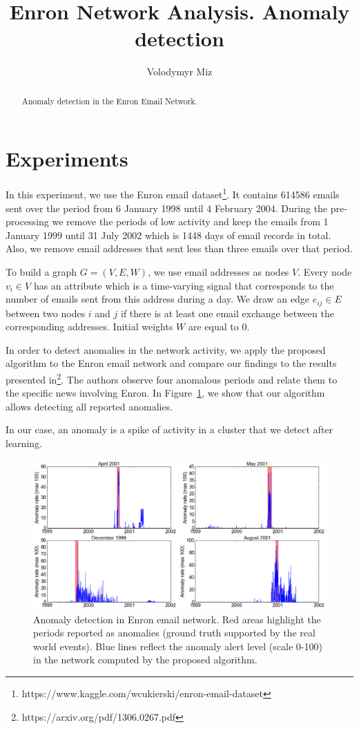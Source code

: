 \documentclass[]{article}
\title{Enron Network Analysis. Anomaly detection}
\author{Volodymyr Miz}
\begin{document}
\maketitle

\begin{abstract}
Anomaly detection in the Enron Email Network.
\end{abstract}

\section{Experiments}
In this experiment, we use the Enron email dataset\footnote{https://www.kaggle.com/wcukierski/enron-email-dataset}. It contains 614586 emails sent over the period from 6 January 1998 until 4 February 2004. During the pre-processing we remove the periods of low activity and keep the emails from 1 January 1999 until 31 July 2002 which is 1448 days of email records in total. Also, we remove email addresses that sent less than three emails over that period.

To build a graph \mbox{$G = (V,E,W)$}, we use email addresses as nodes $V$. Every node $v_i \in V$ has an attribute which is a time-varying signal that corresponds to the number of emails sent from this address during a day. We draw an edge $e_{ij} \in E$ between two nodes $i$ and $j$ if there is at least one email exchange between the corresponding addresses. Initial weights $W$ are equal to $0$.

In order to detect anomalies in the network activity, we apply the proposed algorithm to the Enron email network and compare our findings to the results presented in\footnote{https://arxiv.org/pdf/1306.0267.pdf}. The authors observe four anomalous periods and relate them to the specific news involving Enron. In Figure~\ref{fig: enron}, we show that our algorithm allows detecting all reported anomalies.

In our case, an anomaly is a spike of activity in a cluster that we detect after learning.

\begin{figure}[t!]
	\centering
	\includegraphics[width=\columnwidth]{figures/enron.png}
	\caption{ Anomaly detection in Enron email network. Red areas highlight the periods reported as anomalies (ground truth supported by the real world events). Blue lines reflect the anomaly alert level (scale 0-100) in the network computed by the proposed algorithm.}
	\label{fig: enron}
\end{figure}
\end{document}
